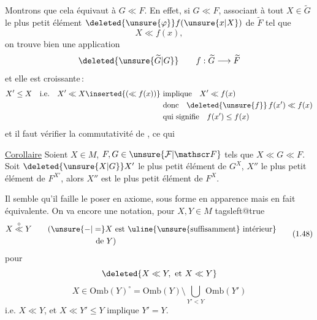 Montrons que cela équivaut à $G\ll F$. En effet, si $G\ll F$, associant à tout $X\in\widetilde G$ le plus petit élément $\deleted{\unsure{\varphi}}f(\unsure{x|X})$ de $\widetilde F$ tel que
\[
 X\ll f(x),
\]
on trouve bien une application
\[
 \deleted{\unsure{\widetilde G|G}}\qquad f:\widetilde G\longrightarrow\widetilde F
\]
et elle est  croissante\,: 
\[
\begin{aligned}
 X'\leq X\quad\text{i.e.}\quad X'\ll X\inserted{(\ll f(x))}\ &\text{implique}\quad X'\ll f(x)\\
 &\text{donc}\quad\deleted{\unsure{f}}\,f(x')\ll f(x)\\
 &\text{qui signifie}\quad f(x')\leq f(x)
\end{aligned}
\]
et il faut vérifier la commutativité de , ce qui  

\uline{Corollaire} Soient $X\in M$, $F,G\in\unsure{\mathcal F|\mathscr F}$ tels que $X\ll G\ll F$.
Soit $\deleted{\unsure{X|G}}X'$ le plus petit élément de $G^X$, $X''$ le plus petit élément de $F^{X'}$, alors $X''$ est  le plus petit élément de $F^X$.

Il semble qu'il faille le poser en axiome, sous forme en apparence \unsure{;|,} mais en fait équivalente. On va   encore une notation, pour $X,Y\in M$
\begingroup\csname tagsleft@true\endcsname
\[
\begin{aligned}
 X\overset{\circ}{\ll}Y\qquad &(\unsure{-|=}X\text{ est \uline{\unsure{suffisamment} intérieur}}\\
 &\hspace{6em}\text{de }Y)
\end{aligned}
\tag*{(1.48)}
\]
\endgroup
pour
\[
 \deleted{X\ll Y,\ \text{et}\ X\ll Y}
\]
\[
 X\in\mathrm{Omb}(Y)^{\circ}=\mathrm{Omb}(Y)\setminus\bigcup_{Y'<Y}\mathrm{Omb}(Y')
\]
i.e. $X\ll Y$, et $X\ll Y'\leq Y$ implique $Y'=Y$.
